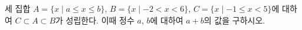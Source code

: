 세 집합 $A=\{x \mid a\le x\le b\}$, $B=\{x \mid -2<x<6\}$, $C=\{x \mid -1\le x<5\}$에 대하여 $C\subset A\subset B$가 성립한다. 이때 정수 $a$, $b$에 대하여 $a+b$의 값을 구하시오.
